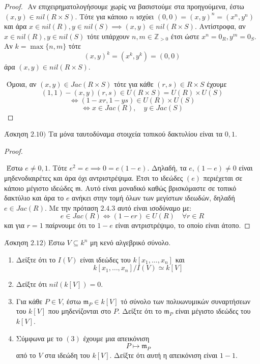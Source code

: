 \documentclass[oneside,a4paper]{article}
\newcommand{\Z}{\mathbb{Z}}
\begin{document}
\begin{proof}
	$ $\newline
	Αν επιχειρηματολογήσουμε χωρίς να βασιστούμε στα προηγούμενα, έστω $(x,y) \in nil(R\times S)$. Τότε για κάποιο $n$ ισχύει $(0,0) = (x,y)^n = (x^n,y^n)$ και άρα $x \in nil(R), y \in nil(S) \implies (x,y) \in nil(R\times S)$.
	Αντίστροφα, αν $x \in nil(R), y \in nil(S)$ τότε υπάρχουν $n,m \in \Z_{>0}$ έτσι ώστε $x^n = 0_R, y^m = 0_S$. Αν $k = \max\{n,m\}$ τότε
	$$ (x,y)^k = (x^k,y^k) = (0,0) $$
	άρα $(x,y) \in nil(R\times S)$.

	$ $\newline
	Όμοια, αν $(x,y) \in Jac(R\times S)$ τότε για κάθε $(r,s) \in R\times S$ έχουμε
	$$(1,1) - (x,y)(r,s) \in U(R\times S) = U(R) \times U(S)$$
	$$\iff (1-xr,1-ys) \in U(R)\times U(S)$$
	$$\iff x \in Jac(R), \quad y \in Jac(S)$$
\end{proof}
\pagebreak


\noindent Άσκηση $2.10)$
\quad Τα μόνα ταυτοδύναμα στοιχεία τοπικού δακτυλίου είναι τα $0,1$.

\begin{proof} $ $
	
	$ $\newline
	Έστω $e \neq 0,1$. Τότε $e^2 = e \implies 0 = e(1-e)$. Δηλαδή, τα $e,(1-e) \neq 0$ είναι μηδενοδιαιρέτες και άρα όχι αντριστρέψιμα. Έτσι το ιδεώδες $(e)$ περιέχεται σε κάποιο μέγιστο ιδεώδες $\mathfrak{m}$. Αυτό είναι μοναδικό καθώς βρισκόμαστε σε τοπικό δακτύλιο και άρα το $e$ ανήκει στην τομή όλων των μεγίστων ιδεωδών, δηλαδή $e \in Jac(R)$. Με την πρόταση $2.4.3$ αυτό είναι ισοδύναμο με:
	$$e \in Jac(R) \iff (1-er) \in U(R) \quad \forall r \in R$$
	και για $r=1$ παίρνουμε ότι το $1-e$ είναι αντριστρέψιμο, το οποίο είναι άτοπο.

\end{proof}
\pagebreak

\noindent Άσκηση $2.12)$
\quad Έστω $V \subseteq k^n$ μη κενό αλγεβρικό σύνολο.
\begin{enumerate}
	\item Δείξτε ότι το $I(V)$ είναι ιδεώδες του $k[x_1 ,\ldots , x_n ]$ και
	$$ k[x_1, \ldots , x_n ] / I(V) \simeq k[V]$$
	\item Δείξτε ότι $nil(k[V])=0$.
	\item Για κάθε $P \in V$, έστω $\mathfrak{m}_P \in k[V]$ τό σύνολο των πολυωνυμικών συναρτήσεων του $k[V]$ που μηδενίζονται στο $P$. Δείξτε ότι το $\mathfrak{m}_P$ είναι μέγιστο ιδεώδες του $k[V]$.
	\item Σύμφωνα με το $(3)$ έχουμε μια απεικόνιση
	$$P \mapsto \mathfrak{m}_P$$
	από το $V$ στα ιδεώδη του $k[V]$. Δείξτε ότι αυτή η απεικόνιση είναι $1-1$.
\end{enumerate}
\end{document}
